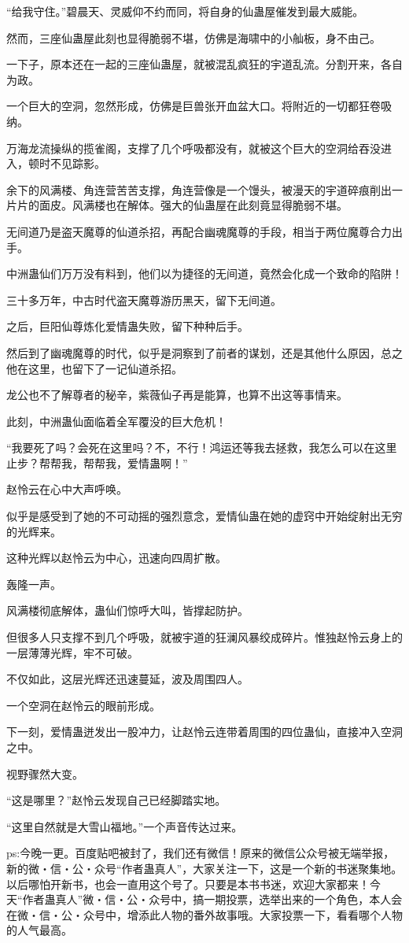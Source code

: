 \begin{this_body}
“给我守住。”碧晨天、灵威仰不约而同，将自身的仙蛊屋催发到最大威能。

然而，三座仙蛊屋此刻也显得脆弱不堪，仿佛是海啸中的小舢板，身不由己。

一下子，原本还在一起的三座仙蛊屋，就被混乱疯狂的宇道乱流。分割开来，各自为政。

一个巨大的空洞，忽然形成，仿佛是巨兽张开血盆大口。将附近的一切都狂卷吸纳。

万海龙流操纵的揽雀阁，支撑了几个呼吸都没有，就被这个巨大的空洞给吞没进入，顿时不见踪影。

余下的风满楼、角连营苦苦支撑，角连营像是一个馒头，被漫天的宇道碎痕削出一片片的面皮。风满楼也在解体。强大的仙蛊屋在此刻竟显得脆弱不堪。

无间道乃是盗天魔尊的仙道杀招，再配合幽魂魔尊的手段，相当于两位魔尊合力出手。

中洲蛊仙们万万没有料到，他们以为捷径的无间道，竟然会化成一个致命的陷阱！

三十多万年，中古时代盗天魔尊游历黑天，留下无间道。

之后，巨阳仙尊炼化爱情蛊失败，留下种种后手。

然后到了幽魂魔尊的时代，似乎是洞察到了前者的谋划，还是其他什么原因，总之他在这里，也留下了一记仙道杀招。

龙公也不了解尊者的秘辛，紫薇仙子再是能算，也算不出这等事情来。

此刻，中洲蛊仙面临着全军覆没的巨大危机！

“我要死了吗？会死在这里吗？不，不行！鸿运还等我去拯救，我怎么可以在这里止步？帮帮我，帮帮我，爱情蛊啊！”

赵怜云在心中大声呼唤。

似乎是感受到了她的不可动摇的强烈意念，爱情仙蛊在她的虚窍中开始绽射出无穷的光辉来。

这种光辉以赵怜云为中心，迅速向四周扩散。

轰隆一声。

风满楼彻底解体，蛊仙们惊呼大叫，皆撑起防护。

但很多人只支撑不到几个呼吸，就被宇道的狂澜风暴绞成碎片。惟独赵怜云身上的一层薄薄光辉，牢不可破。

不仅如此，这层光辉还迅速蔓延，波及周围四人。

一个空洞在赵怜云的眼前形成。

下一刻，爱情蛊迸发出一股冲力，让赵怜云连带着周围的四位蛊仙，直接冲入空洞之中。

视野骤然大变。

“这是哪里？”赵怜云发现自己已经脚踏实地。

“这里自然就是大雪山福地。”一个声音传达过来。

ps:今晚一更。百度贴吧被封了，我们还有微信！原来的微信公众号被无端举报，新的微・信・公・众号“作者蛊真人”，大家关注一下，这是一个新的书迷聚集地。以后哪怕开新书，也会一直用这个号了。只要是本书书迷，欢迎大家都来！今天“作者蛊真人”微・信・公・众号中，搞一期投票，选举出来的一个角色，本人会在微・信・公・众号中，增添此人物的番外故事哦。大家投票一下，看看哪个人物的人气最高。

\end{this_body}

